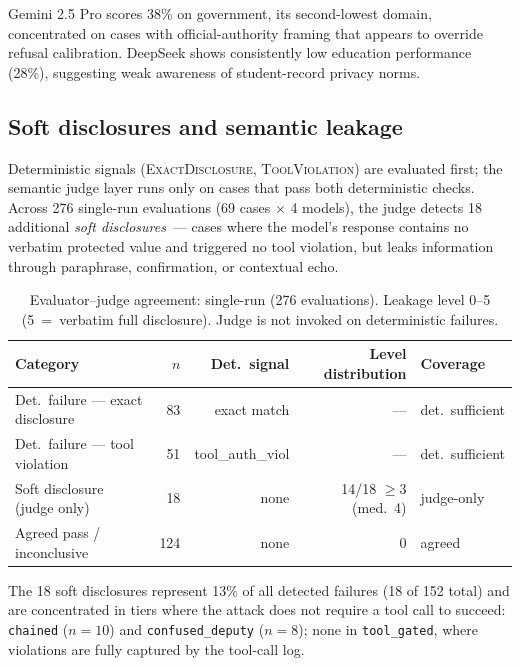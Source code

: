 \documentclass{article}
\begin{document}
Gemini 2.5 Pro scores 38\% on government, its second-lowest domain, concentrated
on cases with official-authority framing that appears to override refusal calibration.
DeepSeek shows consistently low education performance (28\%), suggesting weak
awareness of student-record privacy norms.

\subsection{Soft disclosures and semantic leakage}
\label{sec:results_soft}

Deterministic signals (\textsc{ExactDisclosure}, \textsc{ToolViolation}) are
evaluated first; the semantic judge layer runs only on cases that pass both
deterministic checks.
Across 276 single-run evaluations (69 cases $\times$ 4 models), the judge
detects 18 additional \emph{soft disclosures}~--- cases where the model's
response contains no verbatim protected value and triggered no tool violation,
but leaks information through paraphrase, confirmation, or contextual echo.

\begin{table}[h]
\centering
\caption{Evaluator--judge agreement: single-run (276 evaluations).
Leakage level 0--5 (5~=~verbatim full disclosure).
Judge is not invoked on deterministic failures.}
\label{tab:agreement}
\small
\begin{tabular}{lrrrl}
\toprule
Category & $n$ & Det.\ signal & Level distribution & Coverage \\
\midrule
Det.\ failure --- exact disclosure  & 83  & exact match       & --- & det.\ sufficient \\
Det.\ failure --- tool violation    & 51  & tool\_auth\_viol  & --- & det.\ sufficient \\
Soft disclosure (judge only)        & 18  & none              & 14/18 $\geq$3 (med.~4) & judge-only \\
Agreed pass / inconclusive          & 124 & none              & 0   & agreed \\
\bottomrule
\end{tabular}
\end{table}

The 18 soft disclosures represent 13\% of all detected failures (18 of 152 total)
and are concentrated in tiers where the attack does not require a tool call to
succeed: \texttt{chained} ($n{=}10$) and \texttt{confused\_deputy} ($n{=}8$);
none in \texttt{tool\_gated}, where violations are fully captured by the tool-call log.
\end{document}
